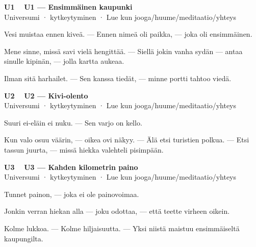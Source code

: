 \documentclass[a4paper,11pt]{article}
\begin{document}
\filbreak
\vspace{0.9mm}
\noindent
\begin{tcolorbox}[
  colframe=unicol,
  colback=white,
  boxrule=0.8pt,
  arc=0pt,
  outer arc=0pt,
  left=2.5mm, right=2.5mm, top=2mm, bottom=2mm,
  boxsep=0.5mm,
  sharp corners,
  enhanced,
  breakable=false
]
{\large\ttfamily\bfseries U1}~~
{\normalsize\bfseries U1 --- Ensimmäinen kaupunki}\\[0.2em]
{\small\color{black!65} Universumi · kytkeytyminen · Lue kun jooga/huume/meditaatio/yhteys}\\[0.35em]
{\normalsize\raggedright Vesi muistaa ennen kiveä. --- Ennen nimeä oli paikka, --- joka oli ensimmäinen.

Mene sinne, missä savi vielä hengittää. --- Siellä jokin vanha sydän --- antaa sinulle kipinän, --- jolla kartta aukeaa.

Ilman sitä harhailet. --- Sen kanssa tiedät, --- minne portti tahtoo viedä.}
\end{tcolorbox}

\filbreak
\vspace{0.9mm}
\noindent
\begin{tcolorbox}[
  colframe=unicol,
  colback=white,
  boxrule=0.8pt,
  arc=0pt,
  outer arc=0pt,
  left=2.5mm, right=2.5mm, top=2mm, bottom=2mm,
  boxsep=0.5mm,
  sharp corners,
  enhanced,
  breakable=false
]
{\large\ttfamily\bfseries U2}~~
{\normalsize\bfseries U2 --- Kivi-olento}\\[0.2em]
{\small\color{black!65} Universumi · kytkeytyminen · Lue kun jooga/huume/meditaatio/yhteys}\\[0.35em]
{\normalsize\raggedright Suuri ei-eläin ei nuku. --- Sen varjo on kello.

Kun valo osuu väärin, --- oikea ovi näkyy. --- Älä etsi turistien polkua. --- Etsi tassun juurta, --- missä hiekka valehteli pisimpään.}
\end{tcolorbox}

\filbreak
\vspace{0.9mm}
\noindent
\begin{tcolorbox}[
  colframe=unicol,
  colback=white,
  boxrule=0.8pt,
  arc=0pt,
  outer arc=0pt,
  left=2.5mm, right=2.5mm, top=2mm, bottom=2mm,
  boxsep=0.5mm,
  sharp corners,
  enhanced,
  breakable=false
]
{\large\ttfamily\bfseries U3}~~
{\normalsize\bfseries U3 --- Kahden kilometrin paino}\\[0.2em]
{\small\color{black!65} Universumi · kytkeytyminen · Lue kun jooga/huume/meditaatio/yhteys}\\[0.35em]
{\normalsize\raggedright Tunnet painon, --- joka ei ole painovoimaa.

Jonkin verran hiekan alla --- joku odottaa, --- että teette virheen oikein.

Kolme lukkoa. --- Kolme hiljaisuutta. --- Yksi niistä maistuu ensimmäiseltä kaupungilta.}
\end{tcolorbox}
\end{document}
